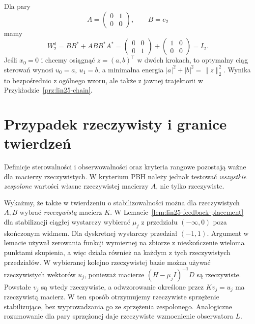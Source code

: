 \begin{przyklad}
\label{prz:lin25-energy}
Dla pary
\[
 A=\begin{pmatrix}0&1\\0&0\end{pmatrix},
 \qquad B=e_2
\]
mamy
\[
 W_2^{\mathrm d}
 =BB^*+ABB^*A^*
 =\begin{pmatrix}0&0\\0&1\end{pmatrix}
  +\begin{pmatrix}1&0\\0&0\end{pmatrix}
 =I_2.
\]
Jeśli \(x_0=0\)
i chcemy osiągnąć
\(z=(a,b)^{\mathsf T}\)
w dwóch krokach,
to optymalny ciąg sterowań
wynosi \(u_0=a\), \(u_1=b\),
a minimalna energia
\(|a|^2+|b|^2=\|z\|_2^2\).
Wynika to bezpośrednio
z ogólnego wzoru,
ale także z jawnej trajektorii
w Przykładzie~\ref{prz:lin25-chain}.
\end{przyklad}

\section{Przypadek rzeczywisty i granice twierdzeń}
\label{sec:lin25-real}

\begin{uwaga}
\label{rem:lin25-real}
Definicje sterowalności
i obserwowalności
oraz kryteria rangowe
pozostają ważne dla macierzy
rzeczywistych.
W kryterium PBH
należy jednak testować
\emph{wszystkie zespolone}
wartości własne
rzeczywistej macierzy \(A\),
nie tylko rzeczywiste.

Wykażmy, że także
w twierdzeniu o stabilizowalności
można dla rzeczywistych \(A,B\)
wybrać \emph{rzeczywistą}
macierz \(K\).
W
Lemacie~\ref{lem:lin25-feedback-placement}
dla stabilizacji ciągłej
wystarczy wybierać
\(\mu_j\) z przedziału
\((-\infty,0)\) poza
skończonym widmem.
Dla dyskretnej
wystarczy przedział \((-1,1)\).
Argument w lemacie
używał zerowania funkcji
wymiernej na zbiorze
z nieskończenie wieloma punktami
skupienia, a więc działa
również na każdym z tych
rzeczywistych przedziałów.
W wybieranej kolejno
rzeczywistej bazie
można używać rzeczywistych
wektorów \(u_j\),
ponieważ macierze
\((H-\mu_jI)^{-1}D\)
są rzeczywiste.
Powstałe \(v_j\)
są wtedy rzeczywiste,
a odwzorowanie określone
przez \(Kv_j=u_j\)
ma rzeczywistą macierz.
W ten sposób
otrzymujemy rzeczywiste
sprzężenie stabilizujące,
bez wyprowadzania go
ze sprzężenia zespolonego.
Analogiczne rozumowanie
dla pary sprzężonej
daje rzeczywiste
wzmocnienie obserwatora \(L\).
\end{uwaga}

